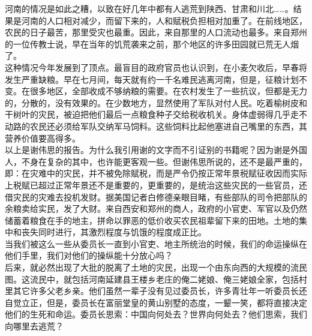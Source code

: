 河南的情况是如此之糟，以致在好几年中都有人逃荒到陕西、甘肃和川北……。结果是河南的人口相对减少，而留下来的，人和赋税负担相对加重了。在前线地区，农民的日子最苦，那里受灾也最重。因此，来自那里的人口流动也最多。来自郑州的一位传教士说，早在当年的饥荒袭来之前，那个地区的许多田园就已荒无人烟了。\\

这种情况今年发展到了顶点。最盲目的政府官员也认识到，在小麦欠收后，早春将发生严重缺粮。早在七月间，每天就有约一千名难民逃离河南，但是，征粮计划不变。在很多地区，全部收成不够纳粮的需要。在农村发生了一些抗议，但都是无力的，分散的，没有效果的。在少数地方，显然使用了军队对付人民。吃着榆树皮和干树叶的灾民，被迫把他们最后一点粮食种子交给税收机关。身体虚弱得几乎走不动路的农民还必须给军队交纳军马饲料。这些饲料比起他塞进自己嘴里的东西，其营养价值要高得多。\\

以上是谢伟思的报告。为什么我引用谢的文字而不引证别的书籍呢？因为谢是外国人，不身在复杂的其中，也许能更客观一些。但谢伟思所说的，还不是最严重的，即：在灾难中的灾民，并不被免除赋税，而是严令仍按正常年景税赋征收因而实际上税赋已超过正常年景还不是重要的，更重要的，是统治这些灾民的一些官员，还借灾民的灾难去投机发财。据美国记者白修德亲眼目睹，有些部队的司令把部队的余粮卖给实民，发了大财。来自西安和郑州的商人，政府的小官吏、军官以及仍然储蓄着粮食在手的地主，拼命以罪恶的低价收买农民祖辈留下来的田地。土地的集中和丧失同时进行，其激烈程度与饥饿的程度成正比。\\

当我们被这么一些从委员长一直到小官吏、地主所统治的时候，我们的命运操纵在他们手里，我们对他们的操纵能十分放心吗？\\

后来，就必然出现了大批的脱离了土地的灾民，出现一个由东向西的大规模的流民图。这流民中，就包括河南延建县王楼乡老庄的俺二姥娘、俺三姥娘全家，包括村里其它许多父老乡亲。他们虽然一辈子没有见过委员长，许多青壮年一听委员长还自觉立正，但是，委员长在富丽堂皇的黄山别墅的态度，一颦一笑，都将直接决定他们的生死和命运。委员长思索：中国向何处去？世界向何处去？他们思索，我们向哪里去逃荒？\\